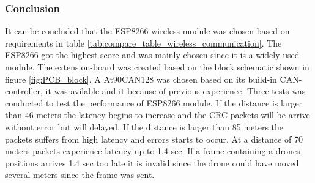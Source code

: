 \subsubsection*{Conclusion}
It can be concluded that the ESP8266 wireless module was chosen based on requirements in table \ref{tab:compare_table_wireless_communication}. The ESP8266 got the highest score and was mainly chosen since it is a widely used module. The extension-board was created based on the block schematic shown in figure \ref{fig:PCB_block}. A At90CAN128 was chosen based on its build-in CAN-controller, it was avilable and it because of previous experience. Three tests was conducted to test the performance of ESP8266 module. If the distance is larger than 46 meters the latency begins to increase and the CRC packets will be arrive without error but will delayed. If the distance is larger than 85 meters the packets suffers from high latency and errors starts to occur.
At a distance of 70 meters packets experience latency up to 1.4 sec. If a frame containing a drones positions arrives 1.4 sec too late it is invalid since the drone could have moved several meters since the frame was sent.

